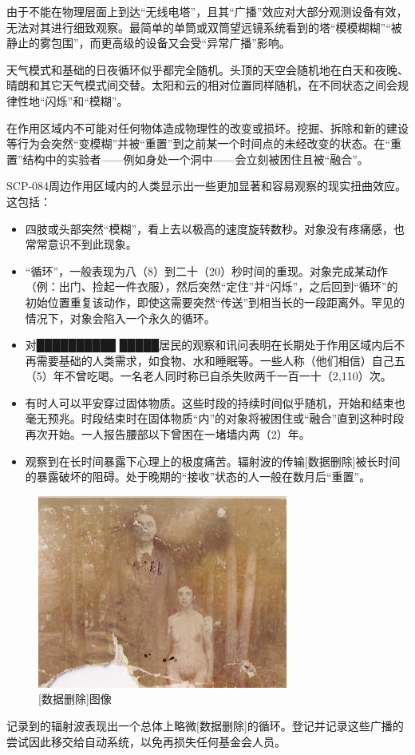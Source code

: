 \hr

由于不能在物理层面上到达“无线电塔”，且其“广播”效应对大部分观测设备有效，无法对其进行细致观察。最简单的单筒或双筒望远镜系统看到的塔“模模糊糊”“被静止的雾包围”，而更高级的设备又会受“异常广播”影响。

\hr

天气模式和基础的日夜循环似乎都完全随机。头顶的天空会随机地在白天和夜晚、晴朗和其它天气模式间交替。太阳和云的相对位置同样随机，在不同状态之间会规律性地“闪烁”和“模糊”。

\hr

在作用区域内不可能对任何物体造成物理性的改变或损坏。挖掘、拆除和新的建设等行为会突然“变模糊”并被“重置”到之前某一个时间点的未经改变的状态。在“重置”结构中的实验者——例如身处一个洞中——会立刻被困住且被“融合”。

\hr

SCP-084周边作用区域内的人类显示出一些更加显著和容易观察的现实扭曲效应。这包括：

\begin{itemize}
\item 四肢或头部突然“模糊”，看上去以极高的速度旋转数秒。对象没有疼痛感，也常常意识不到此现象。
\item “循环”，一般表现为八（8）到二十（20）秒时间的重现。对象完成某动作（例：出门、捡起一件衣服），然后突然“定住”并“闪烁”，之后回到“循环”的初始位置重复该动作，即使这需要突然“传送”到相当长的一段距离外。罕见的情况下，对象会陷入一个永久的循环。
\item 对██████████ █████居民的观察和讯问表明在长期处于作用区域内后不再需要基础的人类需求，如食物、水和睡眠等。一些人称（他们相信）自己五（5）年不曾吃喝。一名老人同时称已自杀失败两千一百一十（2,110）次。
\item 有时人可以平安穿过固体物质。这些时段的持续时间似乎随机，开始和结束也毫无预兆。时段结束时在固体物质“内”的对象将被困住或“融合”直到这种时段再次开始。一人报告腰部以下曾困在一堵墙内两（2）年。
\item 观察到在长时间暴露下心理上的极度痛苦。辐射波的传输{[}数据删除]被长时间的暴露破坏的阻碍。处于晚期的“接收”状态的人一般在数月后“重置”。
\end{itemize}

\begin{figure}[H]
    \centering
    \includegraphics[width=0.5\linewidth]{images/log.084.a4.3.jpg}
    \caption*{{[}数据删除]图像}
\end{figure}

\hr

记录到的辐射波表现出一个总体上略微{[}数据删除]的循环。登记并记录这些广播的尝试因此移交给自动系统，以免再损失任何基金会人员。
